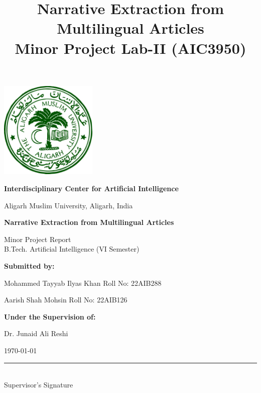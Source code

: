 \documentclass[12pt]{article}
\title{\Huge \bfseries Narrative Extraction from Multilingual Articles \\[1em] \large Minor Project Lab-II (AIC3950)}
\author{}
\date{}
\begin{document}
\begin{titlepage}
    \centering

    \includegraphics[width=0.35\textwidth]{images/amu_logo.jpg}\par
    \vspace{1em}
    {\large \bfseries Interdisciplinary Center for Artificial Intelligence \par}
    \vspace{0.5em}
    {\large Aligarh Muslim University, Aligarh, India\par}
    \vfill
    {\LARGE \bfseries Narrative Extraction from Multilingual Articles \par}
    \vspace{1cm}
    {\large Minor Project Report \\[0.3em]
    B.Tech. Artificial Intelligence (VI Semester)\par}
    \vfill

    {\large \bfseries Submitted by:\par}
    \vspace{0.5em}
    {\large Mohammed Tayyab Ilyas Khan \hfill Roll No: 22AIB288\par}
    {\large Aarish Shah Mohsin \hfill Roll No: 22AIB126\par}
    \vspace{1.5em}
    
    {\large \bfseries Under the Supervision of:\par}
    \vspace{0.5em}
    {\large Dr. Junaid Ali Reshi\par}

    \vfill
    {\large \today\par}

    \vspace{3em}
    \hfill \rule{4cm}{0.4pt}\\
    \hfill {\small Supervisor's Signature}
\end{titlepage}
\end{document}
